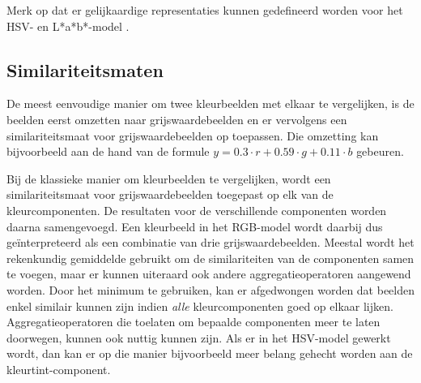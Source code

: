Merk op dat er gelijkaardige representaties kunnen gedefineerd worden voor het HSV- en L*a*b*-model
\cite{vanderweken:construction_of_quality_measures}.

\subsection{Similariteitsmaten}
\label{sectie:kleurbeelden_similariteitsmaten}

De meest eenvoudige manier om twee kleurbeelden met elkaar te vergelijken, is de beelden eerst omzetten naar 
grijswaardebeelden en er vervolgens een similariteitsmaat voor grijswaardebeelden op toepassen. Die omzetting 
kan bijvoorbeeld aan de hand van de formule $y = 0.3 \cdot r + 0.59 \cdot g + 0.11 \cdot b$ 
\cite{debaets:similariteitsmaten_voor_kleurbeelden} gebeuren.

Bij de klassieke manier om kleurbeelden te vergelijken, wordt een similariteitsmaat 
voor grijswaardebeelden toegepast op elk van de kleurcomponenten. De resultaten voor de
verschillende componenten worden daarna samengevoegd. Een kleurbeeld in het RGB-model wordt daarbij
dus ge\"interpreteerd als een combinatie van drie grijswaardebeelden. Meestal wordt
het rekenkundig gemiddelde gebruikt om de similariteiten van de componenten samen te voegen,
maar er kunnen uiteraard ook andere aggregatieoperatoren aangewend worden. Door het minimum
te gebruiken, kan er afgedwongen worden dat beelden enkel similair kunnen
zijn indien \emph{alle} kleurcomponenten goed op elkaar lijken. Aggregatieoperatoren
die toelaten om bepaalde componenten meer te laten doorwegen, kunnen ook nuttig
kunnen zijn. Als er in het HSV-model gewerkt wordt, dan kan er op die manier 
bijvoorbeeld meer belang gehecht worden aan de kleurtint-component.

